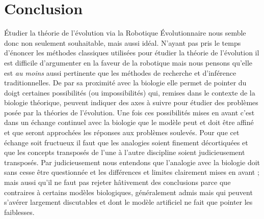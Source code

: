 \documentclass[a4paper,10pt]{article}
\begin{document}
\section{Conclusion}
\'Etudier la théorie de l'évolution via la Robotique \'Evolutionnaire nous semble donc non seulement souhaitable, mais aussi idéal. N'ayant pas pris le temps d'énoncer les méthodes classiques utilisées pour étudier la théorie de l'évolution il est difficile d'argumenter en la faveur de la robotique mais nous pensons qu'elle est \emph{au moins} aussi pertinente que les méthodes de recherche et d'inférence traditionnelles. De par sa proximité avec la biologie elle permet de pointer du doigt certaines possibilités (ou impossibilités) qui, remises dans le contexte de la biologie théorique, peuvent indiquer des axes à suivre pour étudier des problèmes posée par la théories de l'évolution. Une fois ces possibilités mises en avant c'est dans un échange continuel avec la biologie que le modèle peut et doit être affiné et que seront approchées les réponses aux problèmes soulevés. Pour que cet échange soit fructueux il faut que les analogies soient finement décortiquées et que les concepts transposés de l'une à l'autre discipline soient judicieusement transposés. Par judicieusement nous entendons que l'analogie avec la biologie doit sans cesse être questionnée et les différences et limites clairement mises en avant ; mais aussi qu'il ne faut pas rejeter hâtivement des conclusions parce que contraires à certains modèles biologiques, généralement admis mais qui peuvent s'avérer largement discutables et dont le modèle artificiel ne fait que pointer les faiblesses.



\end{document}
